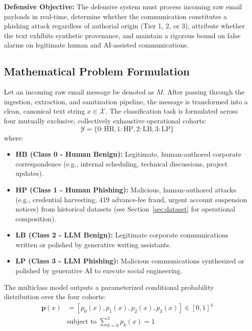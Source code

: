 \documentclass[journal]{IEEEtran}
\begin{document}
\textbf{Defensive Objective:} The defensive system must process incoming raw email payloads in real-time, determine whether the communication constitutes a phishing attack regardless of authorial origin (Tier 1, 2, or 3), attribute whether the text exhibits synthetic provenance, and maintain a rigorous bound on false alarms on legitimate human and AI-assisted communications.

\subsection{Mathematical Problem Formulation}
Let an incoming raw email message be denoted as $M$. After passing through the ingestion, extraction, and sanitization pipeline, the message is transformed into a clean, canonical text string $x \in \mathcal{X}$. The classification task is formulated across four mutually exclusive, collectively exhaustive operational cohorts:
\begin{equation}
    \mathcal{Y} = \{0: \text{HB}, 1: \text{HP}, 2: \text{LB}, 3: \text{LP}\}
\end{equation}
where:
\begin{itemize}
    \item \textbf{HB (Class 0 - Human Benign):} Legitimate, human-authored corporate correspondence (e.g., internal scheduling, technical discussions, project updates).
    \item \textbf{HP (Class 1 - Human Phishing):} Malicious, human-authored attacks (e.g., credential harvesting, 419 advance-fee fraud, urgent account suspension notices) from historical datasets (see Section~\ref{sec:dataset} for operational composition).
    \item \textbf{LB (Class 2 - LLM Benign):} Legitimate corporate communications written or polished by generative writing assistants.
    \item \textbf{LP (Class 3 - LLM Phishing):} Malicious communications synthesized or polished by generative AI to execute social engineering.
\end{itemize}

The multiclass model outputs a parameterized conditional probability distribution over the four cohorts:
\begin{equation}
\begin{aligned}
    \mathbf{p}(x) &= [p_0(x), p_1(x), p_2(x), p_3(x)] \in [0, 1]^4 \\
    &\text{subject to } \sum_{k=0}^3 p_k(x) = 1
\end{aligned}
\end{equation}
\end{document}
